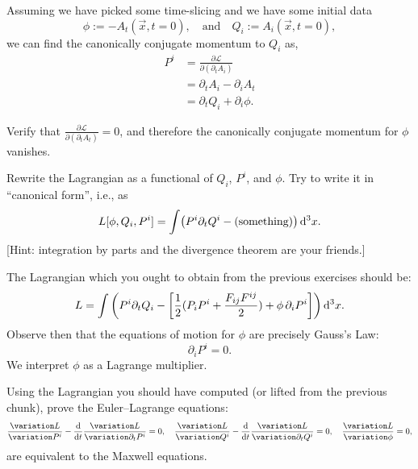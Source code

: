 Assuming we have picked some time-slicing and we have some initial data
\begin{equation}
\phi:=-A_{t}(\vec{x},t=0),\quad\mbox{and}\quad Q_{i}:=A_{i}(\vec{x},t=0),
\end{equation}
we can find the canonically conjugate momentum to $Q_{i}$ as,
\begin{subequations}
\begin{align}
P^{i} &= \frac{\partial\mathcal{L}}{\partial(\partial_{t}A_{i})}\\
&=\partial_{t}A_{i}-\partial_{i}A_{t}\\
&=\partial_{t}Q_{i}+\partial_{i}\phi.
\end{align}
\end{subequations}

\begin{exercise}
Verify that $\displaystyle\frac{\partial\mathcal{L}}{\partial(\partial_{t}A_{t})}=0$,
and therefore the canonically conjugate momentum for $\phi$ vanishes.
\end{exercise}

\begin{exercise}
Rewrite the Lagrangian as a functional of $Q_{i}$, $P^{i}$, and
$\phi$. Try to write it in ``canonical form'', i.e., as
\[ L[\phi, Q_{i}, P^{i}] = \int \bigl(P^{i}\partial_{t}Q^{i}-\mbox{(something)}\bigr)\,\mathrm{d}^{3}x.\]
[Hint: integration by parts and the divergence theorem are your friends.]
\end{exercise}

\M
The Lagrangian which you ought to obtain from the previous exercises
should be:
\begin{equation}\label{eq:classical-field-theory:electromagnetism:canonical-formalism:lagrangian}
L =
\int\left(P^{i}\partial_{t}Q_{i}-\left[\frac{1}{2}(P_{i}P^{i}+\frac{F_{ij}F^{ij}}{2}) + \phi\,\partial_{i}P^{i}\right]\right)\mathrm{d}^{3}x.
\end{equation}
Observe then that the equations of motion for $\phi$ are precisely
Gauss's Law:
\begin{equation}
\partial_{i}P^{i} = 0.
\end{equation}
We interpret $\phi$ as a Lagrange multiplier.

\begin{exercise}
Using the Lagrangian you should have computed (or lifted from the
previous chunk), prove the Euler--Lagrange equations:
\begin{equation}
\frac{\variation L}{\variation P^{i}}-\frac{\D}{\D t}\frac{\variation L}{\variation\partial_{t}P^{i}}=0,\quad
\frac{\variation L}{\variation Q^{i}}-\frac{\D}{\D t}\frac{\variation L}{\variation\partial_{t}Q^{i}}=0,\quad
\frac{\variation L}{\variation\phi}=0,
\end{equation}
are equivalent to the Maxwell equations.
\end{exercise}

